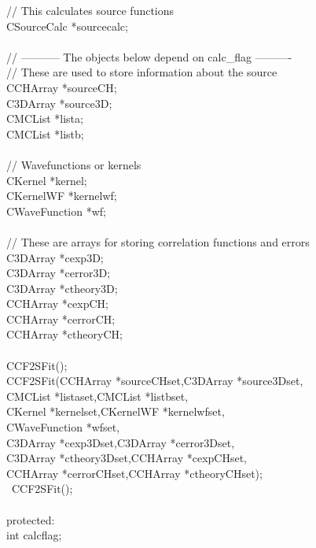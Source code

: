 \documentclass[10pt]{article}
\def\tab{\hspace*{9pt}}
\begin{document}
{\tab\tab  // This calculates source functions\\
\tab\tab  CSourceCalc *sourcecalc;\\
\\
\tab\tab  // ----------- The objects below depend on calc\_flag ----------\\
\tab\tab  // These are used to store information about the source\\
\tab\tab  CCHArray *sourceCH;\\
\tab\tab  C3DArray *source3D;\\
\tab\tab  CMCList *lista;\\
\tab\tab  CMCList *listb;\\
\\
\tab\tab  // Wavefunctions or kernels\\
\tab\tab  CKernel *kernel;\\
\tab\tab  CKernelWF *kernelwf;\\
\tab\tab  CWaveFunction *wf;\\
\\
\tab\tab  // These are arrays for storing correlation functions and errors\\
\tab\tab  C3DArray *cexp3D;\\
\tab\tab  C3DArray *cerror3D;\\
\tab\tab  C3DArray *ctheory3D;\\
\tab\tab  CCHArray *cexpCH;\\
\tab\tab  CCHArray *cerrorCH;\\
\tab\tab  CCHArray *ctheoryCH;\\
\\
\tab\tab  CCF2SFit();\\
\tab\tab  CCF2SFit(CCHArray *sourceCHset,C3DArray *source3Dset,\\
\tab\tab	   CMCList *listaset,CMCList *listbset,\\
\tab\tab	   CKernel *kernelset,CKernelWF *kernelwfset,\\
\tab\tab	   CWaveFunction *wfset,\\
\tab\tab	   C3DArray *cexp3Dset,C3DArray *cerror3Dset,\\
\tab\tab	   C3DArray *ctheory3Dset,CCHArray *cexpCHset,\\
\tab\tab	   CCHArray *cerrorCHset,CCHArray *ctheoryCHset);\\
\tab\tab  ~CCF2SFit();\\
\\
\tab protected:\\
\tab\tab  int calcflag;\\
}
\end{document}
